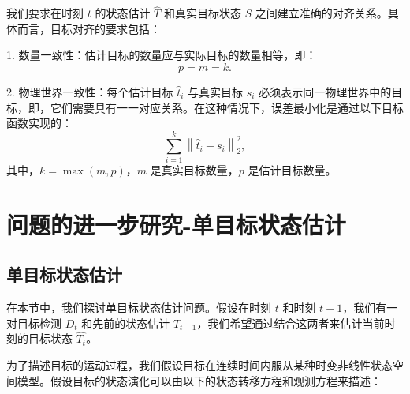 \documentclass{article}
\begin{document}
我们要求在时刻 $t$ 的状态估计 $\hat{T}$ 和真实目标状态 $S$ 之间建立准确的对齐关系。具体而言，目标对齐的要求包括：

1. 数量一致性：估计目标的数量应与实际目标的数量相等，即：
   \[
       p = m = k.
   \]

2. 物理世界一致性：每个估计目标 $\hat{t}_i$ 与真实目标 $s_i$ 必须表示同一物理世界中的目标，即，它们需要具有一一对应关系。在这种情况下，误差最小化是通过以下目标函数实现的：
   \[
       \sum_{i=1}^{k} \left\| \hat{t}_i - s_i \right\|_2^2,
   \]
   其中，$k = \max(m, p)$，$m$ 是真实目标数量，$p$ 是估计目标数量。


\section{问题的进一步研究-单目标状态估计}

\subsection{单目标状态估计}

在本节中，我们探讨单目标状态估计问题。假设在时刻 $t$ 和时刻 $t-1$，我们有一对目标检测 $D_t$ 和先前的状态估计 $T_{t-1}$，我们希望通过结合这两者来估计当前时刻的目标状态 $\hat{T_t}$。

为了描述目标的运动过程，我们假设目标在连续时间内服从某种时变非线性状态空间模型。假设目标的状态演化可以由以下的状态转移方程和观测方程来描述：
\end{document}
